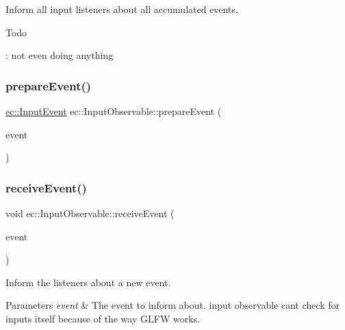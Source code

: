 Inform all input listeners about all accumulated events. 

\begin{DoxyRefDesc}{Todo}
\item[\mbox{\hyperlink{todo__todo000010}{Todo}}]\+: not even doing anything \end{DoxyRefDesc}
\mbox{\label{classec_1_1_input_observable_a7aaa88f25dd3d8902bc6767240c83ecf}} 
\subsubsection{\texorpdfstring{prepare\+Event()}{prepareEvent()}}
{\footnotesize\ttfamily \mbox{\hyperlink{structec_1_1_input_event}{ec\+::\+Input\+Event}} ec\+::\+Input\+Observable\+::prepare\+Event (\begin{DoxyParamCaption}\item[{const \mbox{\hyperlink{structec_1_1_input_event}{Input\+Event}} \&}]{event }\end{DoxyParamCaption})\hspace{0.3cm}{\ttfamily [protected]}}

\mbox{\label{classec_1_1_input_observable_ac35d29f643a2735e4cb38cb6ee1354aa}} 
\subsubsection{\texorpdfstring{receive\+Event()}{receiveEvent()}}
{\footnotesize\ttfamily void ec\+::\+Input\+Observable\+::receive\+Event (\begin{DoxyParamCaption}\item[{const \mbox{\hyperlink{structec_1_1_input_event}{Input\+Event}} \&}]{event }\end{DoxyParamCaption})\hspace{0.3cm}{\ttfamily [virtual]}}



Inform the listeners about a new event. 


\begin{DoxyParams}{Parameters}
{\em event} & The event to inform about.  input observable can\textquotesingle{}t check for inputs itself because of the way G\+L\+FW works. \\
\hline
\end{DoxyParams}
\mbox{\label{classec_1_1_input_observable_a542bd14ecfbeceed917ea0df5c7f3755}} 
